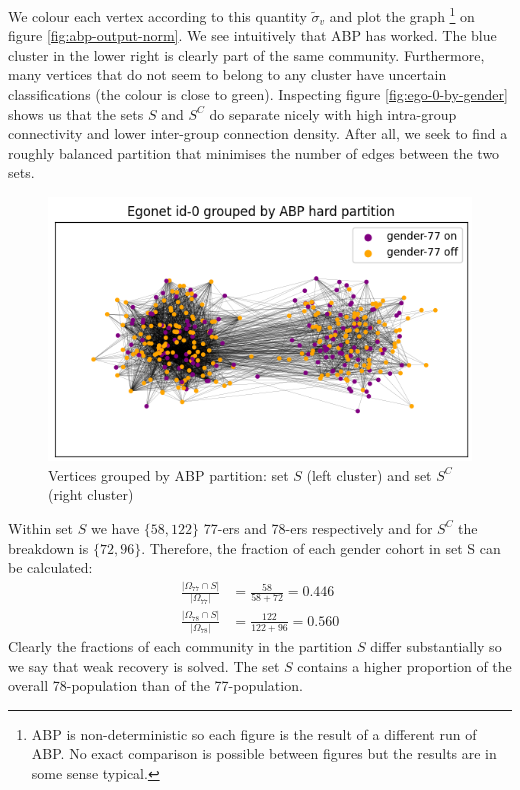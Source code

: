\documentclass[11pt]{article}
\newcommand{\figwidth}{0.7\linewidth}
\begin{document}
\begin{multicols*}{2}
We colour each vertex according to this quantity $\tilde{\sigma}_v$ and plot the graph
\footnote{ABP is non-deterministic so each figure is the result of a different run of ABP. No exact comparison is possible between figures but the results are in some sense typical.}
on figure \ref{fig:abp-output-norm}. We see intuitively that ABP has worked. The blue cluster in the lower right is clearly part of the same community. Furthermore, many vertices that do not seem to belong to any cluster have uncertain classifications (the colour is close to green). Inspecting figure \ref{fig:ego-0-by-gender} shows us that the sets $S$ and $S^C$ do separate nicely with high intra-group connectivity and lower inter-group connection density. After all, we seek to find a roughly balanced partition that minimises the number of edges between the two sets.
%
\begin{figure}[H]
	\centering
	\includegraphics[width=\figwidth]{ego-0-abp-by-gender.png}
	\caption{Vertices grouped by ABP partition: set $S$ (left cluster) and set $S^C$ (right cluster)}
	\label{fig:abp-output-by-gender}
\end{figure}

Within set $S$ we have $\{58, 122\}$ 77-ers and 78-ers respectively and for $S^C$ the breakdown is $\{72, 96\}$. Therefore, the fraction of each gender cohort in set S can be calculated:
%
\begin{equation}
	\begin{aligned}
	\frac{|\Omega_{77} \cap S|}{|\Omega_{77}|} &= \frac{58}{58+72} = 0.446 \\
	\frac{|\Omega_{78} \cap S|}{|\Omega_{78}|} &= \frac{122}{122+96} = 0.560
	\end{aligned}
\end{equation}
%
Clearly the fractions of each community in the partition $S$ differ substantially so we say that weak recovery is solved. The set $S$ contains a higher proportion of the overall 78-population than of the 77-population.


\end{multicols*}
\end{document}
